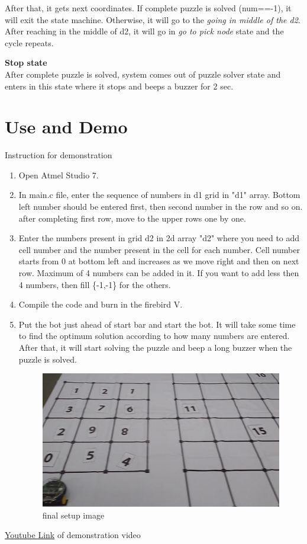 \documentclass[a4paper,12pt,oneside]{book}
\begin{document}
\begin{itemize}
\begin{figure}[]
\end{figure} 
After that, it gets next coordinates. If complete puzzle is solved (num==-1), it will exit the state machine. Otherwise, it will go to the \textit{going in middle of the d2}. After reaching in the middle of d2, it will go in \textit{go to pick node} state and the cycle repeats.

\pagebreak
\end{itemize}
\textbf{Stop state}\\
After complete puzzle is solved, system comes out of puzzle solver state and enters in this state where it stops and beeps a buzzer for 2 sec.
\\
\pagebreak
\section{Use and Demo }
Instruction for demonstration

\begin{enumerate}
	\item Open Atmel Studio 7.
	\item In main.c file, enter the sequence of numbers in d1 grid in "d1" array. Bottom left number should be entered first, then second number in the row and so on. after completing first row, move to the upper rows one by one.
	\item Enter the numbers present in grid d2 in 2d array "d2" where you need to add cell number and the number present in the cell for each number. Cell number starts from 0 at bottom left and increases as we move right and then on next row. Maximum of 4 numbers can be added in it. If you want to add less then 4 numbers, then fill \{-1,-1\} for the others.
	\item Compile the code and burn in the firebird V.
	\item Put the bot just ahead of start bar and start the bot. It will take some time to find the optimum solution according to how many numbers are entered. After that, it will start solving the puzzle and beep a long buzzer when the puzzle is solved.
	\begin{figure}[h]
		\includegraphics[scale=.3]{final_setup.png}
		\caption{final setup image}
	\end{figure}
	 
\end{enumerate}
\href{https://www.youtube.com/watch?v=SvR-iOOgiqY}{Youtube Link} of demonstration video 
\end{document}
